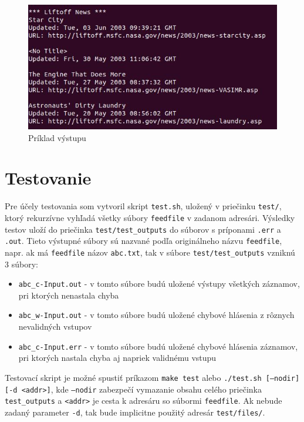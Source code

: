 \documentclass[a4paper, 11pt]{article}
\begin{document}
    \begin{figure}[h]
        \centering
        \includegraphics[width=0.8\linewidth]{img/output.JPG}
        \caption{Príklad výstupu}
        \label{output_fig}
    \end{figure}
    

    \section{Testovanie}
    Pre účely testovania som vytvoril skript \texttt{test.sh}, uložený v priečinku \texttt{test/}, ktorý rekurzívne vyhľadá všetky súbory \texttt{feedfile} v zadanom adresári. Výsledky testov uloží do priečinka \texttt{test/test\_outputs} do súborov s príponami \texttt{.err} a \texttt{.out}. Tieto výstupné súbory sú nazvané podľa originálneho názvu \texttt{feedfile}, napr. ak má \texttt{feedfile} názov \texttt{abc.txt}, tak v súbore \texttt{test/test\_outputs} vzniknú 3 súbory:
    \begin{itemize}
        \item \texttt{abc\_c-Input.out} - v tomto súbore budú uložené výstupy všetkých záznamov, pri ktorých nenastala chyba
        \item \texttt{abc\_w-Input.out} - v tomto súbore budú uložené chybové hlásenia z rôznych nevalidných vstupov
        \item \texttt{abc\_c-Input.err} - v tomto súbore budú uložené chybové hlásenia záznamov, pri ktorých nastala chyba aj napriek validnému vstupu
    \end{itemize}
    
	Testovací skript je možné spustiť príkazom \texttt{make test} alebo \texttt{./test.sh [--nodir] [-d <addr>]}, kde \texttt{--nodir} zabezpečí vymazanie obsahu celého priečinka \texttt{test\_outputs} a \texttt{<addr>} je cesta k adresáru so súbormi \texttt{feedfile}. Ak nebude zadaný parameter \texttt{-d}, tak bude implicitne použitý adresár \texttt{test/files/}. \\ 
	
\end{document}
